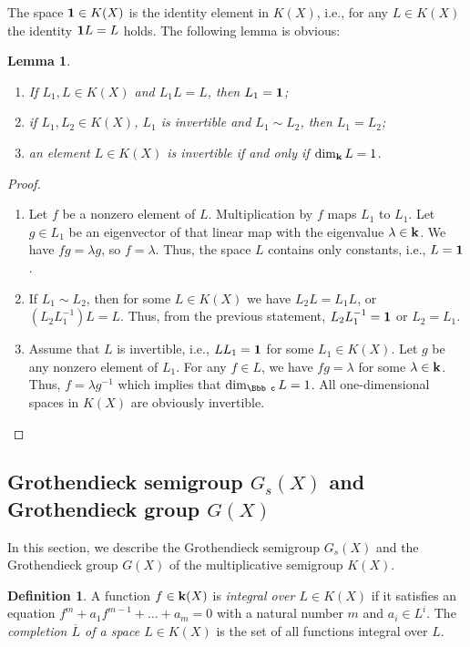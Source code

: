 \documentclass[11pt]{article}
\theoremstyle{plain}
\newtheorem{lemma}[theorem]{Lemma}
\theoremstyle{definition}
\newtheorem{definition}[theorem]{Definition}
\begin{document}
The space $\bold 1\in K(X)$ is the identity element in $K(X)$,  i.e., for any $L\in K(X)$ the identity $\bold 1 L=L$ holds. The following lemma is obvious:

\begin{lemma}\label{invertible}
\begin{enumerate}\item If $L_1,L\in K(X)$ and $L_1L=L$, then $L_1=\bold 1$;
\item if $L_1,L_2\in K(X)$, $L_1$ is invertible and $L_1\sim L_2$, then $L_1=L_2$;
 \item an element $L\in K(X)$ is invertible if and only if $\dim _\bold k L=1$.
\end{enumerate}
\end{lemma}


\begin{proof}
\begin{enumerate} \item Let $f$ be a nonzero element of $L$. Multiplication by $f$ maps $L_1$ to $L_1$. Let $g\in L_1$ be an eigenvector of that linear map with the eigenvalue $\lambda\in \bold k$. We have $fg=\lambda g$, so $f=\lambda$. Thus, the space $L$ contains only constants, i.e., $L=\bold 1$. \item If $L_1\sim L_2$, then for some $L\in K(X)$ we have $L_2L=L_1L$, or $(L_2L^{-1}_1)L=L$. Thus, from the previous statement, $L_2L_1^{-1}=\bold 1$ or $L_2=L_1$.
\item Assume  that $L$ is invertible, i.e., $LL_1=\bold 1$  for some $L_1\in K(X)$. Let $g$ be any nonzero element of $L_1$. For any $f\in L$, we have $fg=\lambda$ for some  $\lambda\in \bold k$. Thus, $f=\lambda g^{-1}$ which implies that $\dim_\Bbb c L=1$. All one-dimensional spaces in $K(X)$ are obviously invertible.
    \end{enumerate}
    \end{proof}

\subsection{Grothendieck semigroup  $G_s(X)$ and Grothendieck group $G(X)$}

In this section, we describe the Grothendieck semigroup  $G_s(X)$  and  the Grothendieck  group   $G(X)$ of the  multiplicative  semigroup $K(X)$.

\begin{definition} A function $f \in \bold k (X)$ is  {\it integral over $L\in K(X)$} if
it satisfies an equation  $f^m+a_1 f^{m-1} + \dots + a_m =0$ with a natural number $m$ and $a_i \in L^i$.
The  {\it completion $\overline{L}$ of a space $L\in K(X)$} is the set  of all  functions integral over $L$.
\end{definition}
\end{document}
